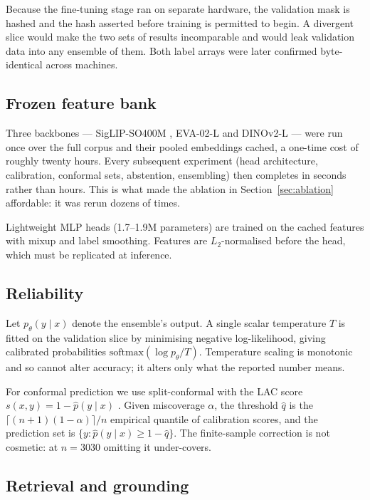 \documentclass[11pt,a4paper,twoside]{article}
\newcommand{\num}[1]{\mbox{#1}}
\begin{document}
Because the fine-tuning stage ran on separate hardware, the validation mask is hashed and
the hash asserted before training is permitted to begin. A divergent slice would make the
two sets of results incomparable and would leak validation data into any ensemble of them.
Both label arrays were later confirmed byte-identical across machines.

\subsection{Frozen feature bank}

Three backbones --- SigLIP-SO400M \cite{zhai2023}, EVA-02-L \cite{fang2023} and DINOv2-L
\cite{oquab2023} --- were run once over the full corpus and their pooled embeddings cached, a
one-time cost of roughly twenty hours. Every subsequent experiment (head architecture,
calibration, conformal sets, abstention, ensembling) then completes in seconds rather than
hours. This is what made the ablation in Section~\ref{sec:ablation} affordable: it was rerun
dozens of times.

Lightweight MLP heads (\num{1.7}--\num{1.9}M parameters) are trained on the cached features
with mixup and label smoothing. Features are $L_2$-normalised before the head, which must be
replicated at inference.

\subsection{Reliability}

Let $p_\theta(y \mid x)$ denote the ensemble's output. A single scalar temperature $T$ is
fitted on the validation slice by minimising negative log-likelihood, giving calibrated
probabilities $\mathrm{softmax}(\log p_\theta / T)$. Temperature scaling is monotonic and so
cannot alter accuracy; it alters only what the reported number means.

For conformal prediction we use split-conformal with the LAC score $s(x,y) = 1 -
\hat{p}(y\mid x)$ \cite{sadinle2019}. Given miscoverage $\alpha$, the threshold $\hat{q}$ is
the $\lceil (n+1)(1-\alpha)\rceil / n$ empirical quantile of calibration scores, and the
prediction set is $\{y : \hat{p}(y \mid x) \ge 1-\hat{q}\}$. The finite-sample correction is
not cosmetic: at $n=3030$ omitting it under-covers.

\subsection{Retrieval and grounding}
\end{document}
